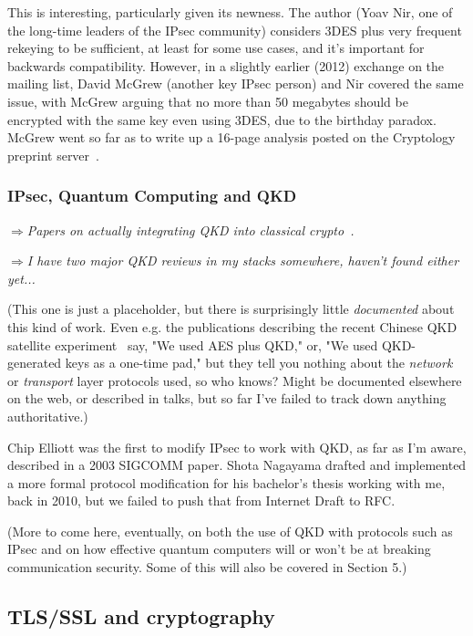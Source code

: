 \documentclass[%
 aip,
 jmp,%
 amsmath,amssymb,
 reprint,%
]{revtex4-1}
\def\comment#1{{\color{ForestGreen}$\Rightarrow${\small\em #1}}}
\begin{document}
This is interesting, particularly given its newness.  The author (Yoav
Nir, one of the long-time leaders of the IPsec community) considers
3DES plus very frequent rekeying to be sufficient, at least for some use
cases, and it's important for backwards compatibility.  However, in a
slightly earlier (2012) exchange on the mailing list, David McGrew
(another key IPsec person) and Nir covered the same issue, with McGrew
arguing that no more than 50 megabytes should be encrypted with the
same key even using 3DES, due to the birthday paradox.  McGrew went so
far as to write up a 16-page analysis posted on the Cryptology
preprint server~\cite{cryptoeprint:2012:623}.

\subsubsection{IPsec, Quantum Computing and QKD}

\comment{Papers on actually integrating QKD into classical crypto~\cite{Alleaume201462,mink09:_qkd_and_ipsec}.}

\comment{I have two major QKD reviews in my stacks somewhere, haven't
  found either yet...}

(This one is just a placeholder, but there is surprisingly little
\emph{documented} about this kind of work.  Even e.g. the publications
describing the recent Chinese QKD satellite
experiment~\cite{PhysRevLett.120.030501} say, "We used AES plus QKD,"
or, "We used QKD-generated keys as a one-time pad," but they tell you
nothing about the \emph{network} or \emph{transport} layer protocols
used, so who knows?  Might be documented elsewhere on the web, or
described in talks, but so far I've failed to track down anything
authoritative.)

Chip Elliott was the first to modify IPsec to work with QKD, as far as
I'm aware, described in a 2003 SIGCOMM paper.  Shota Nagayama drafted
and implemented a more formal protocol modification for his bachelor's
thesis working with me, back in 2010, but we failed to push that from
Internet Draft to RFC.

(More to come here, eventually, on both the use of QKD with protocols
such as IPsec and on how effective quantum computers will or won't be
at breaking communication security.  Some of this will also be covered
in Section 5.)

\subsection{TLS/SSL and cryptography}
\label{sec:tls}
\end{document}
